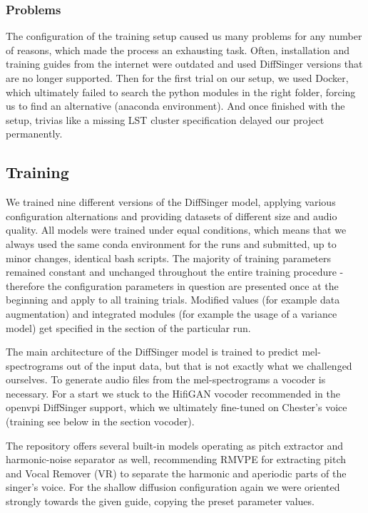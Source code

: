 \documentclass[a4paper]{article}
\begin{document}
	\subsubsection{Problems}
	
	The configuration of the training setup caused us many problems for any number of reasons, which made the process an exhausting task. Often, installation and training guides from the internet were outdated and used DiffSinger versions that are no longer supported. Then for the first trial on our setup, we used Docker, which ultimately failed to search the python modules in the right folder, forcing us to find an alternative (anaconda environment). And once finished with the setup, trivias like a missing LST cluster specification delayed our project permanently. 
	
	\subsection{Training}
	
	We trained nine different versions of the DiffSinger model, applying various configuration alternations and providing datasets of different size and audio quality. All models were trained under equal conditions, which means that we always used the same conda environment for the runs and submitted, up to minor changes, identical bash scripts. The majority of training parameters remained constant and unchanged throughout the entire training procedure - therefore the configuration parameters in question are presented once at the beginning and apply to all training trials. Modified values (for example data augmentation) and integrated modules (for example the usage of a variance model) get specified in the section of the particular run. 
	
	The main architecture of the DiffSinger model is trained to predict mel-spectrograms out of the input data, but that is not exactly what we challenged ourselves. To generate audio files from the mel-spectrograms a vocoder is necessary. For a start we stuck to the HifiGAN vocoder recommended in the openvpi DiffSinger support, which we ultimately fine-tuned on Chester’s voice (training see below in the section vocoder). 
	
	The repository offers several built-in models operating as pitch extractor and harmonic-noise separator as well, recommending RMVPE for extracting pitch and Vocal Remover (VR) to separate the harmonic and aperiodic parts of the singer's voice. For the shallow diffusion configuration again we were oriented strongly towards the given guide, copying the preset parameter values. 
	
\end{document}
